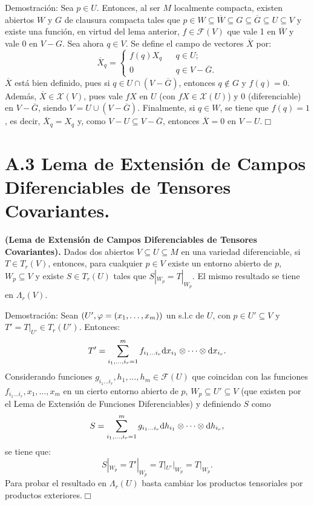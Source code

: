 \documentclass[cursovd_portada.tex]{subfiles}
\begin{document}
{\sc Demostraci\'{o}n:} Sea $p\in U$. Entonces, al ser $M$ localmente compacta, existen abiertos $W$ y $G$ de clausura
compacta tales que $p\in W\subseteq\overline{W}\subseteq G\subseteq\overline{G}\subseteq U\subseteq V$ y existe
una funci\'{o}n, en virtud del lema anterior, $f\in\mathcal{F}(V)$ que vale 1 en $\overline{W}$ y vale 0 en $V-G$. Sea
ahora $q\in V$. Se define el campo de vectores $\overline{X}$ por:
$$\overline{X}_q=\left\{
\begin{array}{ccl}
f(q)X_q & & q\in U;\\
0 & & q\in V-\overline{G}.
\end{array}
\right.$$ \hs $\overline{X}$ est\'{a} bien definido, pues si $q\in U\cap(V-\overline{G})$, entonces $q\notin G$ y
$f(q)=0$. Adem\'{a}s, $\overline{X}\in\mathcal{X}(V)$, pues vale $fX$ en $U$ (con $fX\in\mathcal{X}(U)$) y 0
(diferenciable) en $V-\overline{G}$, siendo $V=U\cup(V-\overline{G})$. Finalmente, si $q\in W$, se tiene que
$f(q)=1$, es decir, $\overline{X}_q=X_q$ y, como $V-U\subseteq V-\overline{G}$, entonces $\overline{X}=0$ en
$V-U$.\hfill $\Box$
\section*{A.3 Lema de Extensi\'{o}n de Campos Diferenciables de Tensores Covariantes.}
\begin{teoap}
{\bf (Lema de Extensi\'{o}n de Campos Diferenciables de Tensores Covariantes).} Dados dos abiertos $V\subseteq
U\subseteq M$ en una variedad diferenciable, si $T\in T_r(V)$, entonces, para cualquier $p\in V$ existe un entorno
abierto de $p$, $W_p\subseteq V$ y existe $S\in T_r(U)$ tales que $S|_{W_p}=T|_{W_p}$. El mismo resultado se tiene
en $\Lambda_r(V)$.
\end{teoap}
{\sc Demostraci\'{o}n:} Sean $(U',\varphi=(x_1,\dots ,x_m))$ un s.l.c de $U$, con $p\in U'\subseteq V$ y $T'=T|_{U'}\in
T_r(U')$. Entonces:
$$T'=\sum_{i_1,\dots ,i_r=1}^mf_{i_1\dots i_r}{\rm d} x_{i_1}\otimes\cdots\otimes{\rm d} x_{i_r}.$$
\hs Considerando funciones $g_{i_1\dots i_r},h_1,\dots ,h_m\in\mathcal{F}(U)$ que coincidan con las funciones
$f_{i_1\dots i_r},x_1,\dots ,x_m$ en un cierto entorno abierto de $p$, $W_p\subseteq U'\subseteq V$ (que existen
por el Lema de Extensi\'{o}n de Funciones Diferenciables) y definiendo $S$ como
$$S=\sum_{i_1,\dots ,i_r=1}^mg_{i_1\dots i_r}{\rm d} h_{i_1}\otimes\cdots\otimes{\rm d} h_{i_r},$$
se tiene que:
$$S|_{W_p}=T'|_{W_p}=T|_{U'}|_{W_p}=T|_{W_p}.$$
\hs Para probar el resultado en $\Lambda_r(U)$ basta cambiar los productos tensoriales por productos
exteriores.\hfill $\Box$
\end{document}
